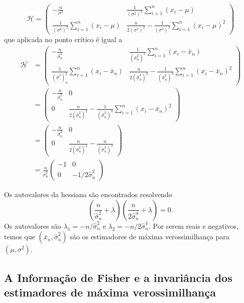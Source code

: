 \documentclass[
  letterpaper,
  DIV=11,
  numbers=noendperiod]{scrartcl}
\begin{document}
\[\mathcal{H}=\left(\begin{array}{cc}
-\frac{n}{\sigma^2} & \frac{1}{(\sigma^2)^2}\sum_{i=1}^{n}(x_i-\mu) \\\frac{1}{(\sigma^2)^2}\sum_{i=1}^{n}(x_i-\mu) & \frac{n}{2(\sigma^2)^2} -\frac{1}{\left(\sigma^2\right)^3}\sum_{i=1}^{n}(x_i-\mu)^2
\end{array}\right)\] que aplicada no ponto crítico é igual a
\[\begin{align*}
\mathcal{H}&=\left(\begin{array}{cc}
-\frac{n}{\hat{\sigma}^2_n} & \frac{1}{(\hat{\sigma}^2_n)^2}\sum_{i=1}^{n}(x_i-\bar{x}_n) \\\frac{1}{(\hat{\sigma}^2)^2_n}\sum_{i=1}^{n}(x_i-\bar{x}_n) & \frac{n}{2(\hat{\sigma}^2_n)^2} -\frac{1}{\left(\hat{\sigma}^2_n\right)^3}\sum_{i=1}^{n}(x_i-\bar{x}_n)^2
\end{array}\right)\\
&=\left(\begin{array}{cc}
-\frac{n}{\hat{\sigma}^2_n} & 0 \\
0 & \frac{n}{2(\hat{\sigma}^2_n)^2} -\frac{1}{\left(\hat{\sigma}^2_n\right)^3}\sum_{i=1}^{n}(x_i-\bar{x}_n)^2
\end{array}\right)\\
&=\left(\begin{array}{cc}
-\frac{n}{\hat{\sigma}^2_n} & 0 \\
0 & \frac{n}{2(\hat{\sigma}^2_n)^2} -\frac{n}{\left(\hat{\sigma}^2_n\right)^2}
\end{array}\right)\\
&=\frac{n}{\hat{\sigma}^2_n}\left(\begin{array}{cc}
-1 & 0 \\
0 & -1/2\hat{\sigma}^2_n
\end{array}\right)
\end{align*}\]

Os autovalores da hessiana são encontrados resolvendo
\[\left(\frac{n}{\hat{\sigma}_n^2}+\lambda\right)\left(\frac{n}{2\hat{\sigma}_n^4}+\lambda\right)=0.\]
Os autovalores são \(\lambda_1=-n/\hat{\sigma}^2_n\) e
\(\lambda_2=-n/2\hat{\sigma}^4_n\). Por serem reais e negativos, temos
que \((\bar{x}_n,\hat{\sigma}^2_n)\) são os estimadores de máxima
verossimilhança para \((\mu,\sigma^2)\).

\subsection{A Informação de Fisher e a invariância dos estimadores de
máxima
verossimilhança}\label{a-informauxe7uxe3o-de-fisher-e-a-invariuxe2ncia-dos-estimadores-de-muxe1xima-verossimilhanuxe7a}
\end{document}
